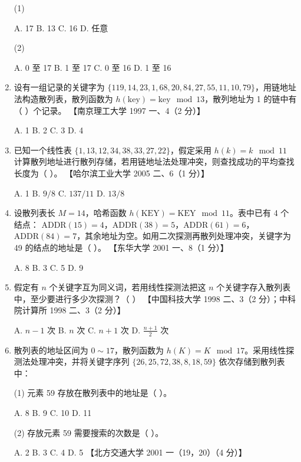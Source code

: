 \documentclass[lang=cn,newtx,10pt,scheme=chinese]{elegantbook}
\begin{document}
\begin{enumerate}
    (1)  

    A. 17 \quad B. 13 \quad C. 16 \quad D. 任意  

    (2)  

    A. 0 至 17 \quad B. 1 至 17 \quad C. 0 至 16 \quad D. 1 至 16  

    \item 设有一组记录的关键字为 $\{119, 14, 23, 1, 68, 20, 84, 27, 55, 11, 10, 79\}$，用链地址法构造散列表，散列函数为 $h(\text{key}) = \text{key} \mod 13$，散列地址为 1 的链中有（ ）个记录。  
    【南京理工大学 1997 一、4（2 分）】  

    A. 1 \quad B. 2 \quad C. 3 \quad D. 4  

    \item 已知一个线性表 $\{1, 13, 12, 34, 38, 33, 27, 22\}$，假定采用 $h(k) = k \mod 11$ 计算散列地址进行散列存储，若用链地址法处理冲突，则查找成功的平均查找长度为（ ）。  
    【哈尔滨工业大学 2005 二、6（1 分）】  

    A. 1 \quad B. $9/8$ \quad C. $137/11$ \quad D. $13/8$  

    \item 设散列表长 $M = 14$，哈希函数 $h(\text{KEY}) = \text{KEY} \mod 11$。表中已有 4 个结点：  
    $\text{ADDR}(15) = 4$，$\text{ADDR}(38) = 5$，$\text{ADDR}(61) = 6$，$\text{ADDR}(84) = 7$，其余地址为空。如用二次探测再散列处理冲突，关键字为 49 的结点的地址是（ ）。  
    【东华大学 2001 一、8（1 分）】 

    A. 8 \quad B. 3 \quad C. 5 \quad D. 9  

    \item 假定有 $n$ 个关键字互为同义词，若用线性探测法把这 $n$ 个关键字存入散列表中，至少要进行多少次探测？（ ）  
    【中国科技大学 1998 二、3（2 分）；中科院计算所 1998 二、3（2 分）】  

    A. $n-1$ 次 \quad B. $n$ 次 \quad C. $n+1$ 次 \quad D. $\frac{n+1}{2}$ 次  

    \item 散列表的地址区间为 $0 \sim 17$，散列函数为 $h(K) = K \mod 17$。采用线性探测法处理冲突，并将关键字序列 $\{26, 25, 72, 38, 8, 18, 59\}$ 依次存储到散列表中：  
    
    (1) 元素 59 存放在散列表中的地址是（ ）。 

    A. 8 \quad B. 9 \quad C. 10 \quad D. 11  
   
    (2) 存放元素 59 需要搜索的次数是（ ）。  
   
    A. 2 \quad B. 3 \quad C. 4 \quad D. 5  
    【北方交通大学 2001 一（19，20）（4 分）】  


\end{enumerate}
\end{document}
